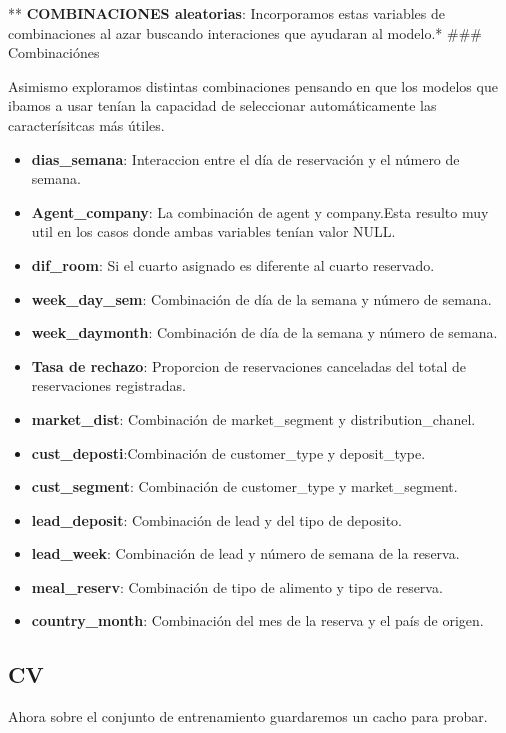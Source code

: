 \documentclass[
]{article}
\begin{document}
** \textbf{COMBINACIONES aleatorias}: Incorporamos estas variables de
combinaciones al azar buscando interaciones que ayudaran al modelo.*
\#\#\# Combinaciónes

Asimismo exploramos distintas combinaciones pensando en que los modelos
que ibamos a usar tenían la capacidad de seleccionar automáticamente las
caracterísitcas más útiles.

\begin{itemize}
\item
  \textbf{dias\_semana}: Interaccion entre el día de reservación y el
  número de semana.
\item
  \textbf{Agent\_company}: La combinación de agent y company.Esta
  resulto muy util en los casos donde ambas variables tenían valor NULL.
\item
  \textbf{dif\_room}: Si el cuarto asignado es diferente al cuarto
  reservado.
\item
  \textbf{week\_day\_sem}: Combinación de día de la semana y número de
  semana.
\item
  \textbf{week\_daymonth}: Combinación de día de la semana y número de
  semana.
\item
  \textbf{Tasa de rechazo}: Proporcion de reservaciones canceladas del
  total de reservaciones registradas.
\item
  \textbf{market\_dist}: Combinación de market\_segment y
  distribution\_chanel.
\item
  \textbf{cust\_deposti}:Combinación de customer\_type y deposit\_type.
\item
  \textbf{cust\_segment}: Combinación de customer\_type y
  market\_segment.
\item
  \textbf{lead\_deposit}: Combinación de lead y del tipo de deposito.
\item
  \textbf{lead\_week}: Combinación de lead y número de semana de la
  reserva.
\item
  \textbf{meal\_reserv}: Combinación de tipo de alimento y tipo de
  reserva.
\item
  \textbf{country\_month}: Combinación del mes de la reserva y el país
  de origen.
\end{itemize}

\hypertarget{cv}{%
\subsection{CV}\label{cv}}

Ahora sobre el conjunto de entrenamiento guardaremos un cacho para
probar.
\end{document}
